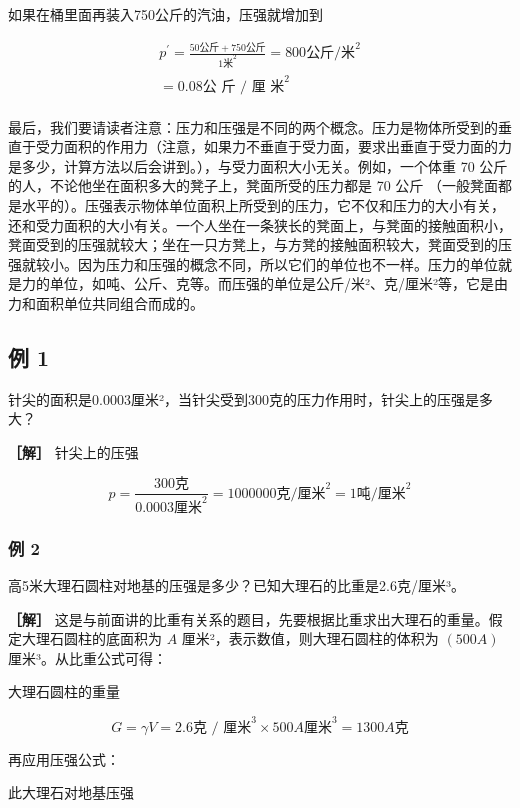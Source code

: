 如果在桶里面再装入750公斤的汽油，压强就增加到

\[
\begin{array}{l} p ^ {\prime} = \frac {50 \text{公斤} + 750 \text{公斤}}{1 \text{米} ^ {2}} = 800 \text{公斤/米} ^ {2} \\ = 0.08 \text{公 斤 / 厘 米} ^ {2} \\ \end{array}
\]

最后，我们要请读者注意：压力和压强是不同的两个概念。压力是物体所受到的垂直于受力面积的作用力（注意，如果力不垂直于受力面，要求出垂直于受力面的力是多少，计算方法以后会讲到。），与受力面积大小无关。例如，一个体重
70 公斤的人，不论他坐在面积多大的凳子上，凳面所受的压力都是 70 公斤
（一般凳面都是水平的）。压强表示物体单位面积上所受到的压力，它不仅和压力的大小有关，还和受力面积的大小有关。一个人坐在一条狭长的凳面上，与凳面的接触面积小，凳面受到的压强就较大；坐在一只方凳上，与方凳的接触面积较大，凳面受到的压强就较小。因为压力和压强的概念不同，所以它们的单位也不一样。压力的单位就是力的单位，如吨、公斤、克等。而压强的单位是公斤/米²、克/厘米²等，它是由力和面积单位共同组合而成的。

\subsection{例 1}\label{ux4f8b-1-2}

针尖的面积是0.0003厘米²，当针尖受到300克的压力作用时，针尖上的压强是多大？

\textbf{［解］} 针尖上的压强

\[
p = \frac {300 \text{克}}{0.0003 \text{厘米} ^ {2}} = 1000000 \text{克/厘米} ^ {2} = 1 \text{吨/厘米} ^ {2}
\]

\subsubsection{例 2}\label{ux4f8b-2-2}

高5米大理石圆柱对地基的压强是多少？已知大理石的比重是2.6克/厘米³。

\textbf{［解］}
这是与前面讲的比重有关系的题目，先要根据比重求出大理石的重量。假定大理石圆柱的底面积为
\(A\) 厘米²，表示数值，则大理石圆柱的体积为 \((500A)\)
厘米³。从比重公式可得：

大理石圆柱的重量

\[
G = \gamma V = 2.6 \text{克 / 厘米} ^ {3} \times 500 A \text{厘米} ^ {3} = 1300 A \text{克}
\]

再应用压强公式：

此大理石对地基压强

